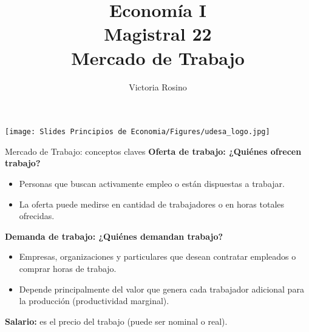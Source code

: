 \documentclass{beamer}
\title[Economía I]{Economía I \vspace{3mm}
\\ Magistral 22 \vspace{3mm} \\ Mercado de Trabajo}
\date{}
\author[Victoria Rosino]{Victoria Rosino}
\institute[]{Universidad de San Andrés}
\begin{document}
\begin{frame}
\vspace{0.3cm}
\titlepage
\centering
\vspace{-0.9cm}
\texttt{[image: Slides Principios de Economia/Figures/udesa\_logo.jpg]} 
\end{frame}

\begin{frame}{Mercado de Trabajo: conceptos claves}
    \vspace{0.3cm}
    \textbf{Oferta de trabajo: ¿Quiénes ofrecen trabajo?}
    \begin{itemize}
        \item Personas que buscan activamente empleo o están dispuestas a trabajar.
        \item La oferta puede medirse en cantidad de trabajadores o en horas totales ofrecidas.
    \end{itemize}

    \vspace{0.3cm}

    \textbf{Demanda de trabajo: ¿Quiénes demandan trabajo?}
    \begin{itemize}
        \item Empresas, organizaciones y particulares que desean contratar empleados o comprar horas de trabajo.
        \item Depende principalmente del valor que genera cada trabajador adicional para la producción (productividad marginal).
    \end{itemize}

    \vspace{0.3cm}

    \textbf{Salario:} es el precio del trabajo (puede ser nominal o real).
\end{frame}
\end{document}
